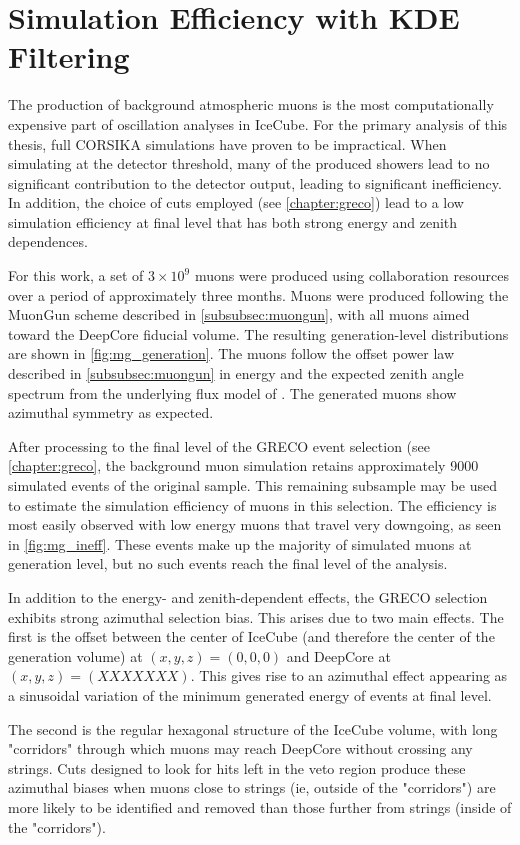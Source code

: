 \section{Simulation Efficiency with KDE Filtering}
The production of background atmospheric muons is the most computationally expensive part of oscillation analyses in IceCube. 
For the primary analysis of this thesis, full CORSIKA simulations have proven to be impractical. 
When simulating at the detector threshold, many of the produced showers lead to no significant contribution to the detector output, leading to significant inefficiency.
In addition, the choice of cuts employed (see \ref{chapter:greco}) lead to a low simulation efficiency at final level that has both strong energy and zenith dependences.

For this work, a set of $3\times 10^{9}$ muons were produced using collaboration resources over a period of approximately three months.
Muons were produced following the MuonGun scheme described in \ref{subsubsec:muongun}, with all muons aimed toward the DeepCore fiducial volume.
The resulting generation-level distributions are shown in \ref{fig:mg_generation}.
The muons follow the offset power law described in \ref{subsubsec:muongun} in energy and the expected zenith angle spectrum from the underlying flux model of \cite{h4a}.
The generated muons show azimuthal symmetry as expected.

After processing to the final level of the GRECO event selection (see \ref{chapter:greco}, the background muon simulation retains approximately 9000 simulated events of the original sample.
This remaining subsample may be used to estimate the simulation efficiency of muons in this selection.
The efficiency is most easily observed with low energy muons that travel very downgoing, as seen in \ref{fig:mg_ineff}.
These events make up the majority of simulated muons at generation level, but no such events reach the final level of the analysis.

In addition to the energy- and zenith-dependent effects, the GRECO selection exhibits strong azimuthal selection bias.
This arises due to two main effects. 
The first is the offset between the center of IceCube (and therefore the center of the generation volume) at $(x,y,z)=(0,0,0)$ and DeepCore at $(x,y,z)=(XXXXXXX)$.
This gives rise to an azimuthal effect appearing as a sinusoidal variation of the minimum generated energy of events at final level.

The second is the regular hexagonal structure of the IceCube volume, with long "corridors" through which muons may reach DeepCore without crossing any strings.
Cuts designed to look for hits left in the veto region produce these azimuthal biases when muons close to strings (ie, outside of the "corridors") are more likely to be identified and removed than those further from strings (inside of the "corridors").

